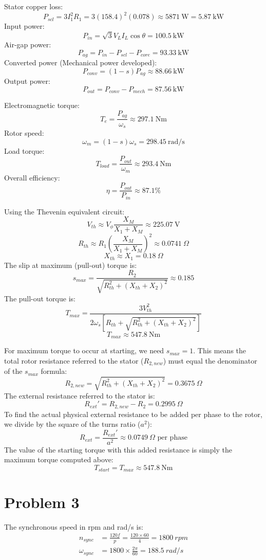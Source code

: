 \documentclass[12pt]{article}
\begin{document}
Stator copper loss:
$$ P_{scl} = 3 I_1^2 R_1 = 3 (158.4)^2 (0.078) \approx \qty{5871}{\W} = \qty{5.87}{\kilo\W} $$
Input power:
$$ P_{in} = \sqrt{3} V_L I_L \cos\theta= \qty{100.5}{\kilo\W} $$
Air-gap power:
$$ P_{ag} = P_{in} - P_{scl} - P_{core} = \qty{93.33}{\kilo\W} $$
Converted power (Mechanical power developed):
$$ P_{conv} = (1 - s)P_{ag} \approx \qty{88.66}{\kilo\W} $$
Output power:
$$ P_{out} = P_{conv} - P_{mech} =\qty{87.56}{\kilo\W} $$


Electromagnetic torque:
$$ T_e = \frac{P_{ag}}{\omega_s} \approx \qty{297.1}{\newton\meter} $$
Rotor speed:
$$ \omega_m = (1 - s)\omega_s = \qty{298.45}{\radian/\second} $$
Load torque:
$$ T_{load} = \frac{P_{out}}{\omega_m} \approx \qty{293.4}{\newton\meter} $$
Overall efficiency:
$$ \eta = \frac{P_{out}}{P_{in}} \approx 87.1\% $$


Using the Thevenin equivalent circuit:
$$ V_{th} \approx V_\phi \frac{X_M}{X_1 + X_M} \approx \qty{225.07}{\V} $$
$$ R_{th} \approx R_1 \left(\frac{X_M}{X_1 + X_M}\right)^2 \approx \qty{0.0741}{\Omega} $$
$$ X_{th} \approx X_1 = \qty{0.18}{\Omega} $$
The slip at maximum (pull-out) torque is:
$$ s_{max} = \frac{R_2}{\sqrt{R_{th}^2 + (X_{th} + X_2)^2}} \approx 0.185 $$
The pull-out torque is:
$$ T_{max} = \frac{3 V_{th}^2}{2 \omega_s \left[ R_{th} + \sqrt{R_{th}^2 + (X_{th} + X_2)^2} \right]} $$
$$ T_{max} \approx \qty{547.8}{\newton\meter} $$



For maximum torque to occur at starting, we need $s_{max} = 1$. This means the total rotor resistance referred to the stator ($R_{2,new}$) must equal the denominator of the $s_{max}$ formula:
$$ R_{2,new} = \sqrt{R_{th}^2 + (X_{th} + X_2)^2} = \qty{0.3675}{\Omega} $$
The external resistance referred to the stator is:
$$ R_{ext}' = R_{2,new} - R_2 = \qty{0.2995}{\Omega} $$
To find the actual physical external resistance to be added per phase to the rotor, we divide by the square of the turns ratio ($a^2$):
$$ R_{ext} = \frac{R_{ext}'}{a^2} \approx \qty{0.0749}{\Omega} \text{ per phase} $$
The value of the starting torque with this added resistance is simply the maximum torque computed above:
$$ T_{start} = T_{max} \approx \qty{547.8}{\newton\meter} $$


\newpage
\section{Problem 3}
The synchronous speed in rpm and rad/s is:
\begin{align*}
	n_{sync} &= \frac{120f}{p} = \frac{120 \times 60}{4} = \SI{1800}{rpm} \\
	\omega_{sync} &= 1800 \times \frac{2\pi}{60} = \SI{188.5}{rad/s}
\end{align*}
\end{document}
